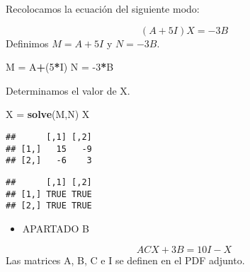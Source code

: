 \documentclass[
]{article}
\newenvironment{Shaded}{\begin{snugshade}}{\end{snugshade}}
\newcommand{\DecValTok}[1]{\textcolor[rgb]{0.00,0.00,0.81}{#1}}
\newcommand{\KeywordTok}[1]{\textcolor[rgb]{0.13,0.29,0.53}{\textbf{#1}}}
\newcommand{\NormalTok}[1]{#1}
\newcommand{\OperatorTok}[1]{\textcolor[rgb]{0.81,0.36,0.00}{\textbf{#1}}}
\newcommand{\StringTok}[1]{\textcolor[rgb]{0.31,0.60,0.02}{#1}}
\providecommand{\tightlist}{%
  \setlength{\itemsep}{0pt}\setlength{\parskip}{0pt}}
\begin{document}
Recolocamos la ecuación del siguiente modo:

\[(A+5I)X = -3B\] Definimos \(M=A+5I\) y \(N=-3B\).

\begin{Shaded}
\begin{Highlighting}[]
\NormalTok{M =}\StringTok{ }\NormalTok{A}\OperatorTok{+}\NormalTok{(}\DecValTok{5}\OperatorTok{*}\NormalTok{I)}
\NormalTok{N =}\StringTok{ }\DecValTok{-3}\OperatorTok{*}\NormalTok{B}
\end{Highlighting}
\end{Shaded}

Determinamos el valor de X.

\begin{Shaded}
\begin{Highlighting}[]
\NormalTok{X =}\StringTok{ }\KeywordTok{solve}\NormalTok{(M,N)}
\NormalTok{X}
\end{Highlighting}
\end{Shaded}

\begin{verbatim}
##      [,1] [,2]
## [1,]   15   -9
## [2,]   -6    3
\end{verbatim}

\begin{Shaded}
\end{Shaded}

\begin{verbatim}
##      [,1] [,2]
## [1,] TRUE TRUE
## [2,] TRUE TRUE
\end{verbatim}

\begin{itemize}
\tightlist
\item
  APARTADO B
\end{itemize}

\[ACX+3B=10I−X\] Las matrices A, B, C e I se definen en el PDF adjunto.
\end{document}
